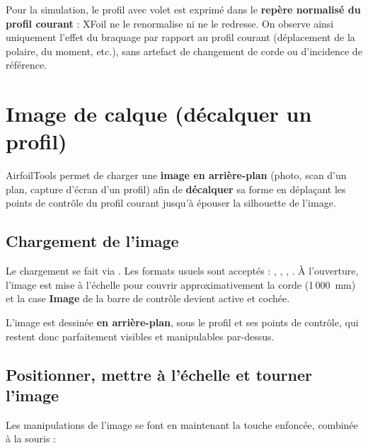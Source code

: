\begin{important}
Pour la simulation, le profil avec volet est exprimé dans le
\textbf{repère normalisé du profil courant} : XFoil ne le
renormalise ni ne le redresse. On observe ainsi uniquement
l'effet du braquage par rapport au profil courant (déplacement de
la polaire, du moment, etc.), sans artefact de changement de corde
ou d'incidence de référence.
\end{important}

\section{Image de calque (décalquer un profil)}
\label{sec:calque}

AirfoilTools permet de charger une \textbf{image en arrière-plan}
(photo, scan d'un plan, capture d'écran d'un profil) afin de
\textbf{décalquer} sa forme en déplaçant les points de contrôle du
profil courant jusqu'à épouser la silhouette de l'image.


\subsection{Chargement de l'image}

Le chargement se fait via . Les formats usuels sont acceptés : ,
, , . À l'ouverture, l'image
est mise à l'échelle pour couvrir approximativement la corde
(1\,000~mm) et la case \textbf{Image} de la barre de contrôle
devient active et cochée.

L'image est dessinée \textbf{en arrière-plan}, sous le profil et ses
points de contrôle, qui restent donc parfaitement visibles et
manipulables par-dessus.

\subsection{Positionner, mettre à l'échelle et tourner l'image}

Les manipulations de l'image se font en maintenant la touche
 enfoncée, combinée à la souris :

